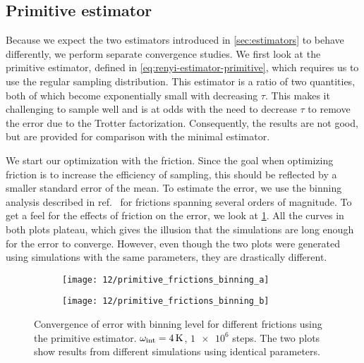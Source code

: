 \subsection{Primitive estimator}

Because we expect the two estimators introduced in \cref{sec:estimators} to behave differently, we perform separate convergence studies.
We first look at the primitive estimator, defined in \vref{eq:renyi-estimator-primitive}, which requires us to use the regular sampling distribution.
This estimator is a ratio of two quantities, both of which become exponentially small with decreasing $\tau$.
This makes it challenging to sample well and is at odds with the need to decrease $\tau$ to remove the error due to the Trotter factorization.
Consequently, the results are not good, but are provided for comparison with the minimal estimator.

We start our optimization with the friction.
Since the goal when optimizing friction is to increase the efficiency of sampling, this should be reflected by a smaller standard error of the mean.
To estimate the error, we use the binning analysis described in ref.~\cite{ambegaokar2010estimating} for frictions spanning several orders of magnitude.
To get a feel for the effects of friction on the error, we look at \cref{fig:primitive-frictions-binning}.
All the curves in both plots plateau, which gives the illusion that the simulations are long enough for the error to converge.
However, even though the two plots were generated using simulations with the same parameters, they are drastically different.

\begin{figure}
	\setlength{\figspacing}{5 mm}
	\centering
	\begin{subfigure}[b]{\textwidth}
		\texttt{[image: 12/primitive\_frictions\_binning\_a]}
		\caption{}
		\vspace{\figspacing}
	\end{subfigure}
	\begin{subfigure}[b]{\textwidth}
		\texttt{[image: 12/primitive\_frictions\_binning\_b]}
		\caption{}
	\end{subfigure}
	\caption[
		Error convergence for primitive estimator
	]{
		Convergence of error with binning level for different frictions using the primitive estimator.
		$\omega_\text{int} = \SI{4}{\kelvin}$, $\num{1e6}$ steps.
		The two plots show results from different simulations using identical parameters.
	}
	\label{fig:primitive-frictions-binning}
\end{figure}

